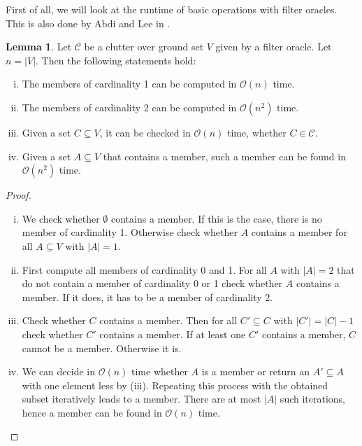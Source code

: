 \documentclass[a4paper, 12pt]{scrbook}
\theoremstyle{definition}
\newtheorem{lemma}[theorem]{Lemma}
\begin{document}
   First of all, we will look at the runtime of basic operations with filter oracles. This is also done by Abdi and Lee in \cite{deltas}.

   \begin{lemma}\label{computations}
       Let $\mathcal{C}$ be a clutter over ground set $V$ given by a filter oracle.
       Let $n=|V|$.
       Then the following statements hold:
       \begin{enumerate}[(i)]
           \item The members of cardinality 1 can be computed in $\mathcal{O}(n)$ time.
           \item The members of cardinality 2 can be computed in $\mathcal{O}(n^2)$ time.
           \item Given a set $C \subseteq V$, it can be checked in $\mathcal{O}(n)$ time, whether $C \in \mathcal{C}$.
           \item Given a set $A \subseteq V$ that contains a member, such a member can be found in $\mathcal{O}(n^2)$ time.
       \end{enumerate}
   \end{lemma}
   \begin{proof}
       \leavevmode
       \begin{enumerate}[(i)]
           \item We check whether $\emptyset$ contains a member. If this is the case, there is no member of cardinality 1. Otherwise check whether $A$ contains a member for all $A \subseteq V$ with $|A|=1$.
           \item First compute all members of cardinality 0 and 1. For all $A$ with $|A|=2$ that do not contain a member of cardinality 0 or 1 check whether $A$ contains a member. If it does, it has to be a member of cardinality 2.
           \item Check whether $C$ contains a member. Then for all $C' \subseteq C$ with $|C'|=|C|-1$ check whether $C'$ contains a member. If at least one $C'$ contains a member, $C$ cannot be a member. Otherwise it is.
           \item We can decide in $\mathcal{O}(n)$ time whether $A$ is a member or return an $A' \subseteq A$ with one element less by (iii). Repeating this process with the obtained subset iteratively leads to a member. There are at most $|A|$ such iterations, hence a member can be found in $\mathcal{O}(n)$ time.
       \end{enumerate}

   \end{proof}
\end{document}
